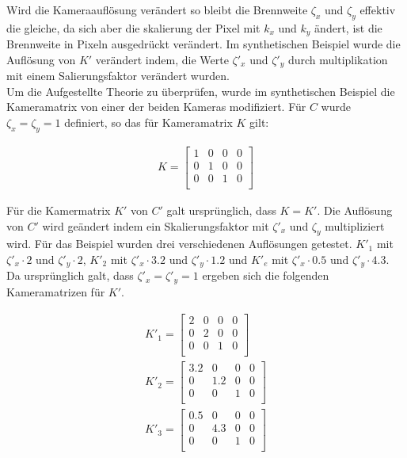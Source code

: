 Wird die Kameraauflösung verändert so bleibt die Brennweite $\zeta_x$ und $\zeta_y$ effektiv die gleiche, da sich aber die skalierung der Pixel mit $k_x$ und $k_y$ ändert, ist die Brennweite in Pixeln ausgedrückt verändert. Im synthetischen Beispiel wurde die Auflösung von $K'$ verändert indem, die Werte $\zeta'_x$ und $\zeta'_y$ durch multiplikation mit einem Salierungsfaktor verändert wurden.\\

Um die Aufgestellte Theorie zu überprüfen, wurde im synthetischen Beispiel die Kameramatrix von einer der beiden Kameras modifiziert. Für $C$ wurde $\zeta_x = \zeta_y = 1$ definiert, so das für Kameramatrix $K$ gilt:

\begin{gather}
	K = \begin{bmatrix}
		1&0&0&0\\
		0&1&0&0\\
		0&0&1&0\\
	\end{bmatrix}
\end{gather}


Für die Kamermatrix $K'$ von $C'$ galt ursprünglich, dass $K = K'$. Die Auflösung von $C'$ wird geändert indem ein Skalierungsfaktor mit $\zeta'_x$ und $\zeta_y$ multipliziert wird. Für das Beispiel wurden drei verschiedenen Auflösungen getestet.  $K'_1$ mit $\zeta'_x \cdot 2$ und $\zeta'_y \cdot 2$, $K'_2$ mit $\zeta'_x \cdot 3.2$ und $\zeta'_y \cdot 1.2$ und $K'_e$ mit $\zeta'_x \cdot 0.5$ und $\zeta'_y \cdot 4.3$. Da ursprünglich galt, dass $\zeta'_x =\zeta'_y = 1$ ergeben sich die folgenden Kameramatrizen für $K'$.



\begin{gather}
	K'_1 = \begin{bmatrix}
		2&0&0&0\\
		0&2&0&0\\
		0&0&1&0\\
	\end{bmatrix}\\
	K'_2 = \begin{bmatrix}
		3.2&0&0&0\\
		0&1.2&0&0\\
		0&0&1&0\\
	\end{bmatrix}\\
	K'_3 = \begin{bmatrix}
		0.5&0&0&0\\
		0&4.3&0&0\\
		0&0&1&0\\
	\end{bmatrix}
\end{gather}\\

